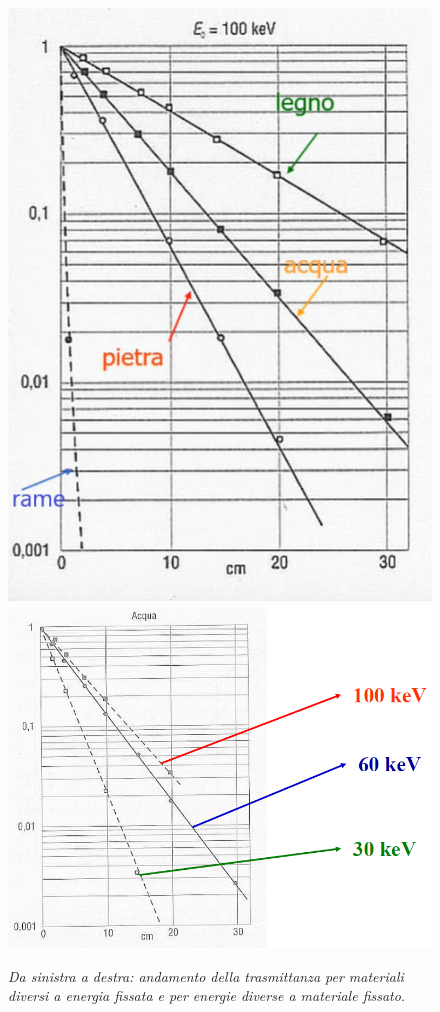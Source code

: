 \begin{figure}[H]
\centering
\includegraphics[scale=0.444]{Immagini/trasmittanza.png}\quad\includegraphics[scale=0.59]{Immagini/trasmittanza2.png}
\caption{\label{fig:trasmittanza} \textit{Da sinistra a destra: andamento della trasmittanza per materiali diversi a energia fissata e per energie diverse a materiale fissato}.}
\end{figure}

